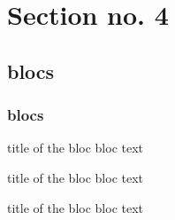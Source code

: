 \documentclass{beamer}
\begin{document}
\section{Section no. 4}
\subsection{blocs}
\begin{frame}
\frametitle{blocs}

\begin{block}{title of the bloc}
bloc text
\end{block}

\begin{exampleblock}{title of the bloc}
bloc text
\end{exampleblock}


\begin{alertblock}{title of the bloc}
bloc text
\end{alertblock}
\end{frame}
\end{document}
